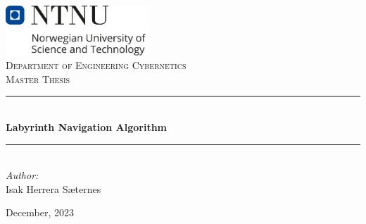
\begin{titlepage}
\vbox{ }
\vbox{ }
\begin{center}


\hspace{5mm}
\includegraphics[width=0.40\textwidth]{01_FRONTMATTER/Images/ntnu_eng_color.png}\\
[1cm]
\textsc{\Large Department of Engineering Cybernetics}\\
[1.5cm]
\textsc{\large Master Thesis}\\
[0.7cm]
\vbox{ }

\rule{\textwidth}{0.2mm} 
\\[0.4cm]
{ \LARGE \bfseries Labyrinth Navigation Algorithm} 
\\[0.1cm]
\rule{\textwidth}{0.2mm} 
\\[1.5cm]

\large
\emph{Author:}\\
Isak Herrera Sæternes \\
\vfill


{\large December, 2023}
\end{center}
\end{titlepage}
